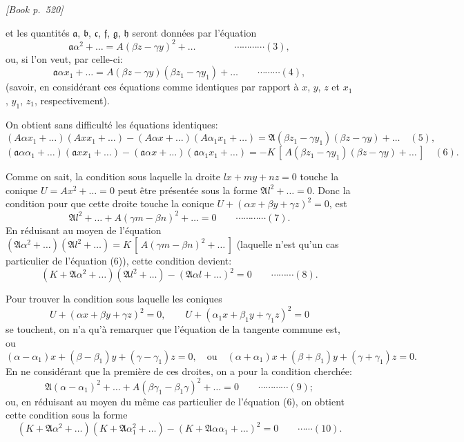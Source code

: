 \documentclass[11pt]{article}
\begin{document}
\medskip
\noindent\textit{[Book p.~520]}\hfill

\smallskip

\noindent et les quantit\'es $\mathfrak{a}$, $\mathfrak{b}$, $\mathfrak{c}$, $\mathfrak{f}$, $\mathfrak{g}$, $\mathfrak{h}$ seront donn\'ees par l'\'equation
\[
\mathfrak{a} \alpha^{2} + \dots = A(\beta z - \gamma y)^{2} + \dots \qquad\qquad\cdots\cdots\cdots\cdots (3),
\]
ou, si l'on veut, par celle-ci:
\[
\mathfrak{a} \alpha x_{1} + \dots = A(\beta z - \gamma y)(\beta z_{1} - \gamma y_{1}) + \dots \qquad\cdots\cdots\cdots (4),
\]
(savoir, en consid\'erant ces \'equations comme identiques par rapport \`a $x$, $y$, $z$ et $x_{1}$, $y_{1}$, $z_{1}$, respectivement).

On obtient sans difficult\'e les \'equations identiques:
\[
(A \alpha x_{1} + \dots)(A x x_{1} + \dots) - (A \alpha x + \dots)(A \alpha_{1} x_{1} + \dots) = \mathfrak{A}(\beta z_{1} - \gamma y_{1})(\beta z - \gamma y) + \dots \quad (5),
\]
\[
(\mathfrak{a} \alpha \alpha_{1} + \dots)(\mathfrak{a} x x_{1} + \dots) - (\mathfrak{a} \alpha x + \dots)(\mathfrak{a} \alpha_{1} x_{1} + \dots) = -K\,[\,A(\beta z_{1} - \gamma y_{1})(\beta z - \gamma y) + \dots\,] \quad (6).
\]

Comme on sait, la condition sous laquelle la droite $l x + m y + n z = 0$ touche la conique $U = A x^{2} + \dots = 0$ peut \^etre pr\'esent\'ee sous la forme $\mathfrak{A} l^{2} + \dots = 0$. Donc la condition pour que cette droite touche la conique $U + (\alpha x + \beta y + \gamma z)^{2} = 0$, est
\[
\mathfrak{A} l^{2} + \dots + A(\gamma m - \beta n)^{2} + \dots = 0 \qquad\cdots\cdots\cdots\cdots (7).
\]
En r\'eduisant au moyen de l'\'equation $(\mathfrak{A}\alpha^{2} + \dots)(\mathfrak{A} l^{2} + \dots) = K\,[\,A(\gamma m - \beta n)^{2} + \dots\,]$ (laquelle n'est qu'un cas particulier de l'\'equation (6)), cette condition devient:
\[
(K + \mathfrak{A}\alpha^{2} + \dots)(\mathfrak{A} l^{2} + \dots) - (\mathfrak{A}\alpha l + \dots)^{2} = 0 \qquad\cdots\cdots\cdots (8).
\]

Pour trouver la condition sous laquelle les coniques
\[
U + (\alpha x + \beta y + \gamma z)^{2} = 0,\qquad U + (\alpha_{1} x + \beta_{1} y + \gamma_{1} z)^{2} = 0
\]
se touchent, on n'a qu'\`a remarquer que l'\'equation de la tangente commune est, ou
\[
(\alpha - \alpha_{1}) x + (\beta - \beta_{1}) y + (\gamma - \gamma_{1}) z = 0,\quad \text{ou}\quad (\alpha + \alpha_{1}) x + (\beta + \beta_{1}) y + (\gamma + \gamma_{1}) z = 0.
\]
En ne consid\'erant que la premi\`ere de ces droites, on a pour la condition cherch\'ee:
\[
\mathfrak{A}(\alpha - \alpha_{1})^{2} + \dots + A(\beta\gamma_{1} - \beta_{1}\gamma)^{2} + \dots = 0 \qquad\cdots\cdots\cdots\cdots (9);
\]
ou, en r\'eduisant au moyen du m\^eme cas particulier de l'\'equation (6), on obtient cette condition sous la forme
\[
(K + \mathfrak{A}\alpha^{2} + \dots)(K + \mathfrak{A}\alpha_{1}^{2} + \dots) - (K + \mathfrak{A}\alpha\alpha_{1} + \dots)^{2} = 0 \qquad\cdots\cdots (10).
\]
\end{document}
